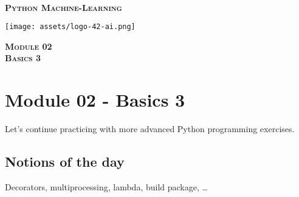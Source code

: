 \documentclass[]{article}
\date{}
\begin{document}

\vspace*{2cm}
\begin{center}
    \textsc{\fontsize{40}{48} \bfseries }\\[0.6cm]
    \textsc{\fontsize{39}{48} \bfseries { %
Python Machine-Learning
    }}\\[0.3cm]
\end{center}
\vspace{3cm}

\begin{center}
\texttt{[image: assets/logo-42-ai.png]}{\centering}
\end{center}

\vspace*{2cm}
\begin{center}
    \textsc{\fontsize{32}{48} \bfseries %
Module 02    
    }\\[0.6cm]
    \textsc{\fontsize{32}{48} \bfseries %
Basics 3    
    }\\[0.3cm]
\end{center}
\vspace{3cm}

\newpage

\setcounter{page}{1}



\hypertarget{module-02---basics-3}{%
\section{Module 02 - Basics 3}\label{module-02---basics-3}}

Let's continue practicing with more advanced Python programming
exercises.

\hypertarget{notions-of-the-day}{%
\subsection{Notions of the day}\label{notions-of-the-day}}

Decorators, multiprocessing, lambda, build package, \ldots{}
\end{document}
